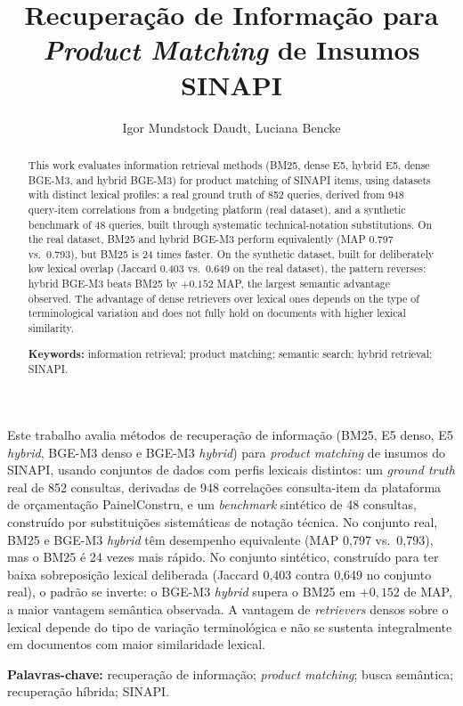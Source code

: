 \documentclass[12pt]{article}
\title{Recupera\c{c}\~ao de Informa\c{c}\~ao para \emph{Product Matching} de Insumos SINAPI}
\author{Igor Mundstock Daudt\inst{1}, Luciana Bencke\inst{1}}
\begin{document}
\maketitle

\begin{abstract}
This work evaluates information retrieval methods (BM25, dense E5, hybrid E5, dense BGE-M3, and hybrid BGE-M3) for product matching of SINAPI items, using datasets with distinct lexical profiles: a real ground truth of 852 queries, derived from 948 query-item correlations from a budgeting platform (real dataset), and a synthetic benchmark of 48 queries, built through systematic technical-notation substitutions. On the real dataset, BM25 and hybrid BGE-M3 perform equivalently (MAP 0.797 vs.\ 0.793), but BM25 is 24 times faster. On the synthetic dataset, built for deliberately low lexical overlap (Jaccard 0.403 vs.\ 0.649 on the real dataset), the pattern reverses: hybrid BGE-M3 beats BM25 by $+0.152$ MAP, the largest semantic advantage observed. The advantage of dense retrievers over lexical ones depends on the type of terminological variation and does not fully hold on documents with higher lexical similarity.

\smallskip
\noindent\textbf{Keywords:} information retrieval; product matching; semantic search; hybrid retrieval; SINAPI.
\end{abstract}

\begin{resumo}
Este trabalho avalia m\'etodos de recupera\c{c}\~ao de informa\c{c}\~ao (BM25, E5 denso, E5 \emph{hybrid}, BGE-M3 denso e BGE-M3 \emph{hybrid}) para \emph{product matching} de insumos do SINAPI, usando conjuntos de dados com perfis lexicais distintos: um \emph{ground truth} real de 852 consultas, derivadas de 948 correla\c{c}\~oes consulta-item da plataforma de or\c{c}amenta\c{c}\~ao PainelConstru, e um \emph{benchmark} sint\'etico de 48 consultas, constru\'ido por substitui\c{c}\~oes sistem\'aticas de nota\c{c}\~ao t\'ecnica. No conjunto real, BM25 e BGE-M3 \emph{hybrid} t\^em desempenho equivalente (MAP 0,797 vs.\ 0,793), mas o BM25 \'e 24 vezes mais r\'apido. No conjunto sint\'etico, constru\'ido para ter baixa sobreposi\c{c}\~ao lexical deliberada (Jaccard 0,403 contra 0,649 no conjunto real), o padr\~ao se inverte: o BGE-M3 \emph{hybrid} supera o BM25 em $+0{,}152$ de MAP, a maior vantagem sem\^antica observada. A vantagem de \emph{retrievers} densos sobre o lexical depende do tipo de varia\c{c}\~ao terminol\'ogica e n\~ao se sustenta integralmente em documentos com maior similaridade lexical.

\smallskip
\noindent\textbf{Palavras-chave:} recupera\c{c}\~ao de informa\c{c}\~ao; \emph{product matching}; busca sem\^antica; recupera\c{c}\~ao h\'ibrida; SINAPI.
\end{resumo}
\end{document}

